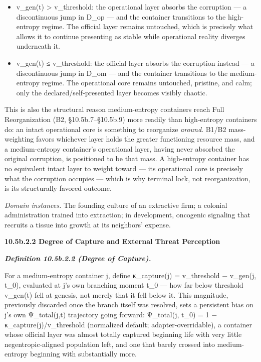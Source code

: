 \documentclass[
]{article}
\begin{document}
\begin{itemize}
\item
  v\_gen(t) \textgreater{} v\_threshold: the operational layer absorbs
  the corruption --- a discontinuous jump in D\_op --- and the container
  transitions to the high-entropy regime. The official layer remains
  untouched, which is precisely what allows it to continue presenting as
  stable while operational reality diverges underneath it.
\item
  v\_gen(t) ≤ v\_threshold: the official layer absorbs the corruption
  instead --- a discontinuous jump in D\_om --- and the container
  transitions to the medium-entropy regime. The operational core remains
  untouched, pristine, and calm; only the declared/self-presented layer
  becomes visibly chaotic.
\end{itemize}

This is also the structural reason medium-entropy containers reach Full
Reorganization (B2, §10.5b.7--§10.5b.9) more readily than high-entropy
containers do: an intact operational core is something to reorganize
\emph{around}. B1/B2 mass-weighting favors whichever layer holds the
greater functioning resource mass, and a medium-entropy container's
operational layer, having never absorbed the original corruption, is
positioned to be that mass. A high-entropy container has no equivalent
intact layer to weight toward --- its operational core is precisely what
the corruption occupies --- which is why terminal lock, not
reorganization, is its structurally favored outcome.

\emph{Domain instances.} The founding culture of an extractive firm; a
colonial administration trained into extraction; in development,
oncogenic signaling that recruits a tissue into growth at its neighbors'
expense.

\textbf{10.5b.2.2 Degree of Capture and External Threat Perception}

\emph{\textbf{Definition 10.5b.2.2 (Degree of Capture).}}

For a medium-entropy container j, define κ\_capture(j) = v\_threshold −
v\_gen(j, t\_0), evaluated at j's own branching moment t\_0 --- how far
below threshold v\_gen(t) fell at genesis, not merely that it fell below
it. This magnitude, previously discarded once the branch itself was
resolved, sets a persistent bias on j's own Ψ\_total(j,t) trajectory
going forward: Ψ\_total(j, t\_0) = 1 − κ\_capture(j)/v\_threshold
(normalized default; adapter-overridable), a container whose official
layer was almost totally captured beginning life with very little
negentropic-aligned population left, and one that barely crossed into
medium-entropy beginning with substantially more.
\end{document}
